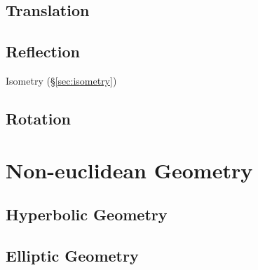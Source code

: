\subsection{Translation}\label{sec:translation}

\subsection{Reflection}\label{sec:reflection}

Isometry (\S\ref{sec:isometry})



\subsection{Rotation}\label{sec:rotation}



\section{Non-euclidean Geometry}\label{sec:noneuclidean_geometry}

\subsection{Hyperbolic Geometry}\label{sec:hyperbolic_geometry}

\subsection{Elliptic Geometry}\label{sec:elliptic_geometry}



